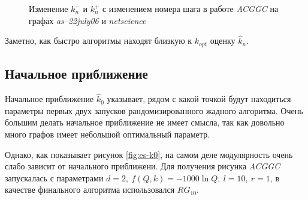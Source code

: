 \begin{figure}[H]
	\columnwidth
	\caption{Изменение $k^{-}_n$ и $k^{+}_n$ с изменением номера шага в работе \emph{ACGGC} на графах \emph{as--22july06} и \emph{netscience}}
	\label{fig:es-alpha-d3}
\end{figure}

Заметно, как быстро алгоритмы находят близкую к $k_{opt}$ оценку $\hat{k}_n$.



\subsection{Начальное приближение}

Начальное приближение $\hat{k}_0$ указывает, рядом с какой точкой будут находиться параметры первых двух запусков рандомизированного жадного алгоритма. Очень большим делать начальное приближение не имеет смысла, так как довольно много графов имеет небольшой оптимальный параметр.

Однако, как показывает рисунок \ref{fig:es-k0}, на самом деле модулярность очень слабо зависит от начального приближени. Для получения рисунка \emph{ACGGC} запускалась с параметрами $d = 2,\ f(Q, k) = -1000 \ln Q,\ l = 10,\ r = 1$, в качестве финального алгоритма использовался $RG_{10}$.


